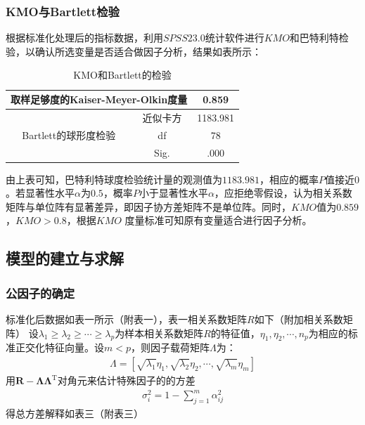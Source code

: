\documentclass{whutmod}
\begin{document}
		\subsubsection{KMO与Bartlett检验}
		根据标准化处理后的指标数据，利用$SPSS23.0$统计软件进行$KMO$和巴特利特检验，以确认所选变量是否适合做因子分析，结果如表\label{tab1}所示：
		\begin{table}[H]
			\centering
			\caption{KMO和Bartlett的检验}\label{tab1}
			\begin{tabular}{cc|cc|cc}
				\toprule[1.5pt]
				\multicolumn{4}{c|}{取样足够度的Kaiser-Meyer-Olkin度量} & \multicolumn{2}{c}{0.859} \\
				\midrule
				\multicolumn{2}{c|}{\multirow{3}[2]{*}{Bartlett的球形度检验}} & \multicolumn{2}{c|}{近似卡方} & \multicolumn{2}{c}{1183.981} \\
				\multicolumn{2}{c|}{} & \multicolumn{2}{c|}{df} & \multicolumn{2}{c}{78} \\
				\multicolumn{2}{c|}{} & \multicolumn{2}{c|}{Sig.} & \multicolumn{2}{c}{.000} \\
				\bottomrule[1.5pt]
			\end{tabular}%
			\label{tab:addlabel}%
		\end{table}%
		
		由上表可知，巴特利特球度检验统计量的观测值为$1183.981$，相应的概率$P$值接近$0$。若显著性水平$α$为$0.5$，概率$P$小于显著性水平$α$，应拒绝零假设，认为相关系数矩阵与单位阵有显著差异，即因子协方差矩阵不是单位阵。同时，$KMO$值为$0.859$，$KMO>0.8$，根据$KMO$ 度量标准可知原有变量适合进行因子分析。
		
		
		

	\subsection{模型的建立与求解}
	\subsubsection{公因子的确定}
	标准化后数据如表一所示（附表一），表一相关系数矩阵$R$如下（附加相关系数矩阵）
	设$\lambda_{1} \geqslant \lambda_{2} \geqslant \cdots \geqslant \lambda_{p}$为样本相关系数矩阵$R$的特征值，$\eta _ { 1 } , \eta _ { 2 } , \cdots , n _ { p }$为相应的标准正交化特征向量。设$m<p$，则因子载荷矩阵$\Lambda$为：
	\begin{gather}
	\Lambda=\left[\sqrt{\lambda_{1}} \eta_{1}, \sqrt{\lambda_{2}} \eta_{2}, \cdots, \sqrt{\lambda_{m}} \eta_{m}\right]
	\end{gather}
    用$\boldsymbol{R}-\boldsymbol{\Lambda} \boldsymbol{\Lambda}^{\mathrm{T}}$对角元来估计特殊因子的的方差
	\begin{gather}
	\sigma_{i}^{2}=1-\sum_{j=1}^{m} \alpha_{i j}^{2}
	\end{gather}
	得总方差解释如表三（附表三）
	
\end{document}
